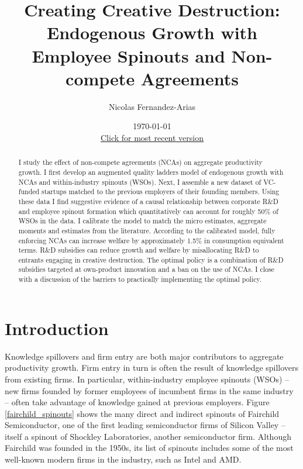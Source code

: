 \documentclass[11pt,english]{article}
\theoremstyle{remark}
\begin{document}
	
\title{Creating Creative Destruction: Endogenous Growth with Employee Spinouts and Non-compete Agreements}

\author{Nicolas Fernandez-Arias} 
\date{\today \\ \small
	\href{https://drive.google.com/file/d/11n9nHuGGPFOg_Hb_tr51DqG0h6vpaZZv/view?usp=sharing}{Click for most recent version}}
\maketitle



\begin{abstract}
	I study the effect of non-compete agreements (NCAs) on aggregate productivity growth. I first develop an augmented quality ladders model of endogenous growth with NCAs and within-industry spinouts (WSOs). Next, I assemble a new dataset of VC-funded startups matched to the previous employers of their founding members. Using these data I find suggestive evidence of a causal relationship between corporate R\&D and employee spinout formation which quantitatively can account for roughly 50\% of WSOs in the data. I calibrate the model to match the micro estimates, aggregate moments and estimates from the literature. According to the calibrated model, fully enforcing NCAs can increase welfare by approximately 1.5\% in consumption equivalent terms. R\&D subsidies can reduce growth and welfare by misallocating R\&D to entrants engaging in creative destruction. The optimal policy is a combination of R\&D subsidies targeted at own-product innovation and a ban on the use of NCAs. I close with a discussion of the barriers to practically implementing the optimal policy.
\end{abstract}

\section{Introduction}

Knowledge spillovers and firm entry are both major contributors to aggregate productivity growth. Firm entry in turn is often the result of knowledge spillovers from existing firms. In particular, within-industry employee spinouts (WSOs) -- new firms founded by former employees of incumbent firms in the same industry -- often take advantage of knowledge gained at previous employers. Figure \ref{fairchild_spinouts} shows the many direct and indirect spinouts of Fairchild Semiconductor, one of the first leading semiconductor firms of Silicon Valley -- itself a spinout of Shockley Laboratories, another semiconductor firm. Although Fairchild was founded in the 1950s, its list of spinouts includes some of the most well-known modern firms in the industry, such as Intel and AMD. 
\end{document}
